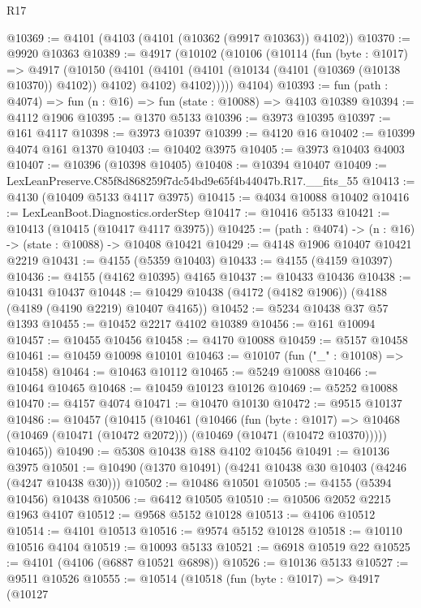 \begin{lexlean}{R17}
\begin{coremodule}
@10369 := @4101 (@4103 (@4101 (@10362 (@9917 @10363)) @4102))
@10370 := @9920 @10363
@10389 := @4917
    (@10102
      (@10106
        (@10114
          (fun (byte : @1017) =>
          @4917
            (@10150
              (@4101
                (@4101 (@4101 (@10134 (@4101 (@10369 (@10138 @10370)) @4102)) @4102) @4102)
                @4102)))))
      @4104)
@10393 := fun (path : @4074) => fun (n : @16) => fun (state : @10088) => @4103 @10389
@10394 := @4112 @1906
@10395 := @1370 @5133
@10396 := @3973 @10395
@10397 := @161 @4117
@10398 := @3973 @10397
@10399 := @4120 @16
@10402 := @10399 @4074 @161 @1370
@10403 := @10402 @3975
@10405 := @3973 @10403 @4003
@10407 := @10396 (@10398 @10405)
@10408 := @10394 @10407
@10409 := LexLeanPreserve.C85f8d868259f7dc54bd9e65f4b44047b.R17.__fits_55
@10413 := @4130 (@10409 @5133 @4117 @3975)
@10415 := @4034 @10088 @10402
@10416 := LexLeanBoot.Diagnostics.orderStep
@10417 := @10416 @5133
@10421 := @10413 (@10415 (@10417 @4117 @3975))
@10425 := (path : @4074) -> (n : @16) -> (state : @10088) -> @10408 @10421
@10429 := @4148 @1906 @10407 @10421 @2219
@10431 := @4155 (@5359 @10403)
@10433 := @4155 (@4159 @10397)
@10436 := @4155 (@4162 @10395) @4165
@10437 := @10433 @10436
@10438 := @10431 @10437
@10448 := @10429 @10438 (@4172 (@4182 @1906)) (@4188 (@4189 (@4190 @2219) @10407 @4165))
@10452 := @5234 @10438 @37 @57 @1393
@10455 := @10452 @2217 @4102 @10389
@10456 := @161 @10094
@10457 := @10455 @10456
@10458 := @4170 @10088
@10459 := @5157 @10458
@10461 := @10459 @10098 @10101
@10463 := @10107 (fun ("_" : @10108) => @10458)
@10464 := @10463 @10112
@10465 := @5249 @10088
@10466 := @10464 @10465
@10468 := @10459 @10123 @10126
@10469 := @5252 @10088
@10470 := @4157 @4074
@10471 := @10470 @10130
@10472 := @9515 @10137
@10486 := @10457
    (@10415
      (@10461
        (@10466
          (fun (byte : @1017) =>
          @10468 (@10469 (@10471 (@10472 @2072))) (@10469 (@10471 (@10472 @10370)))))
        @10465))
@10490 := @5308 @10438 @188 @4102 @10456
@10491 := @10136 @3975
@10501 := @10490 (@1370 @10491) (@4241 @10438 @30 @10403 (@4246 (@4247 @10438 @30)))
@10502 := @10486 @10501
@10505 := @4155 (@5394 @10456) @10438
@10506 := @6412 @10505
@10510 := @10506 @2052 @2215 @1963 @4107
@10512 := @9568 @5152 @10128
@10513 := @4106 @10512
@10514 := @4101 @10513
@10516 := @9574 @5152 @10128
@10518 := @10110 @10516 @4104
@10519 := @10093 @5133
@10521 := @6918 @10519 @22
@10525 := @4101 (@4106 (@6887 @10521 @6898))
@10526 := @10136 @5133
@10527 := @9511 @10526
@10555 := @10514
    (@10518
      (fun (byte : @1017) =>
      @4917
        (@10127

\end{coremodule}
\end{lexlean}
